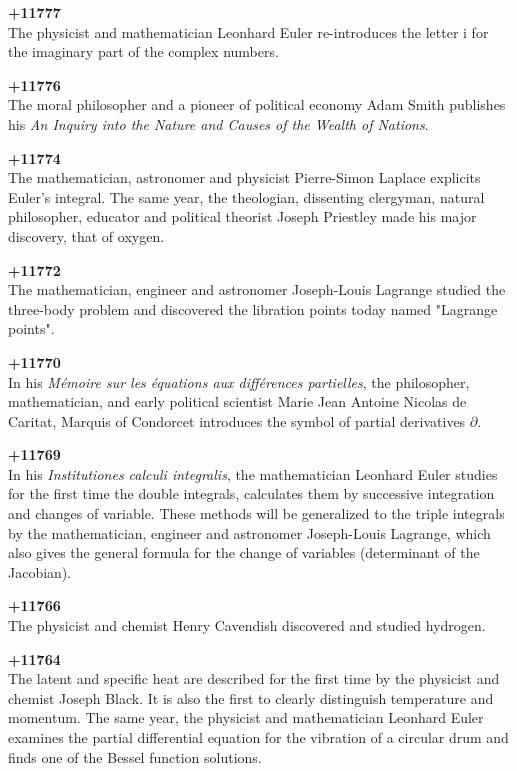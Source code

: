 \textbf{+11777}\\
The physicist and mathematician Leonhard Euler re-introduces the letter $\mathrm{i}$ for the imaginary part of the complex numbers.

\textbf{+11776}\\
The moral philosopher and a pioneer of political economy Adam Smith publishes his \textit{An Inquiry into the Nature and Causes of the Wealth of Nations}.

\textbf{+11774}\\
The mathematician, astronomer and physicist Pierre-Simon Laplace explicits Euler's integral. The same year, the theologian, dissenting clergyman, natural philosopher, educator and political theorist Joseph Priestley made his major discovery, that of oxygen.

\textbf{+11772}\\
The mathematician, engineer and astronomer Joseph-Louis Lagrange studied the three-body problem and discovered the libration points today named "Lagrange points".

\textbf{+11770}\\
In his \textit{Mémoire sur les équations aux différences partielles}, the philosopher, mathematician, and early political scientist Marie Jean Antoine Nicolas de Caritat, Marquis of Condorcet introduces the symbol of partial derivatives $\partial$.

\textbf{+11769}\\
In his \textit{Institutiones calculi integralis}, the mathematician Leonhard Euler studies for the first time the double integrals, calculates them by successive integration and changes of variable. These methods will be generalized to the triple integrals by the mathematician, engineer and astronomer Joseph-Louis Lagrange, which also gives the general formula for the change of variables (determinant of the Jacobian).

\textbf{+11766}\\
The physicist and chemist Henry Cavendish discovered and studied hydrogen.

\textbf{+11764}\\
The latent and specific heat are described for the first time by the physicist and chemist Joseph Black. It is also the first to clearly distinguish temperature and momentum. The same year, the physicist and mathematician Leonhard Euler examines the partial differential equation for the vibration of a circular drum and finds one of the Bessel function solutions.

